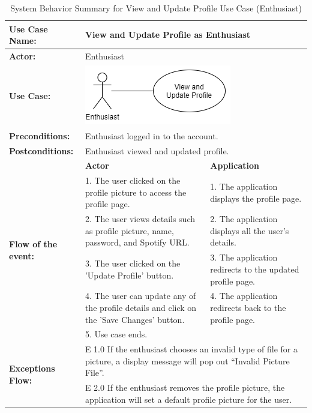 \begin{longtable}{|p{3cm}|p{5cm}|p{5cm}|}
    \caption{System Behavior Summary for View and Update Profile Use Case (Enthusiast)} \\
    \hline
    \textbf{Use Case Name:} & \multicolumn{2}{l|}{View and Update Profile as Enthusiast} \\ \hline
    \textbf{Actor:} & \multicolumn{2}{l|}{Enthusiast} \\ \hline
    \textbf{Use Case:} & \multicolumn{2}{l|}{\includegraphics[width=0.5\linewidth]{mainmatter/images/sucd9.png}} \\ \hline
    \textbf{Preconditions:} & \multicolumn{2}{p{10cm}|}{Enthusiast logged in to the account.} \\ \hline
    \textbf{Postconditions:} & \multicolumn{2}{p{10cm}|}{Enthusiast viewed and updated profile.} \\ \hline
    \multirow{6}{3cm}{\raggedright \textbf{Flow of the event:}} & \textbf{Actor} & \textbf{Application} \\ \cline{2-3}
    & 1. The user clicked on the profile picture to access the profile page. & 1. The application displays the profile page. \\ \cline{2-3}
    & 2. The user views details such as profile picture, name, password, and Spotify URL. & 2. The application displays all the user's details.  \\ \cline{2-3}
    & 3. The user clicked on the 'Update Profile' button. & 3. The application redirects to the updated profile page.  \\ \cline{2-3}
    & 4. The user can update any of the profile details and click on the 'Save Changes' button. & 4. The application redirects back to the profile page. \\ \cline{2-3}
    & 5. Use case ends. & \\ \hline
    \multirow{2}{3cm}{\raggedright \textbf{Exceptions Flow:}} & \multicolumn{2}{p{10cm}|}{\raggedright E 1.0 If the enthusiast chooses an invalid type of file for a picture, a display message will pop out “Invalid Picture File”.} \\ \cline{2-3}
    & \multicolumn{2}{p{10cm}|}{\raggedright E 2.0 If the enthusiast removes the profile picture, the application will set a default profile picture for the user.} \\ \hline
\end{longtable}
\pagebreak

